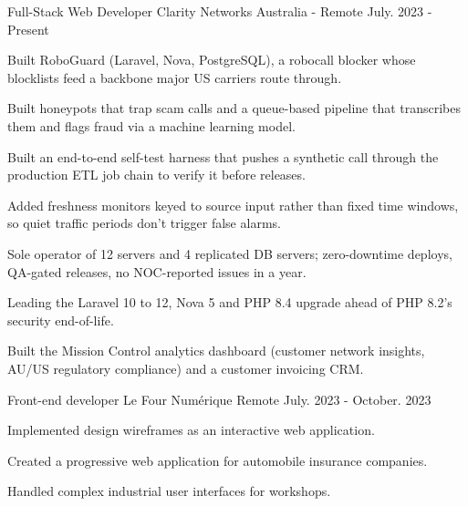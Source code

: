 

\begin{cventries}
  \cventry
    {Full-Stack Web Developer} %
    {Clarity Networks} %
    {Australia - Remote} %
    {July. 2023 - Present} %
    {
      \begin{cvitems} %
        \item {Built RoboGuard (Laravel, Nova, PostgreSQL), a robocall blocker whose blocklists feed a backbone major US carriers route through.}
        \item {Built honeypots that trap scam calls and a queue-based pipeline that transcribes them and flags fraud via a machine learning model.}
        \item {Built an end-to-end self-test harness that pushes a synthetic call through the production ETL job chain to verify it before releases.}
        \item {Added freshness monitors keyed to source input rather than fixed time windows, so quiet traffic periods don't trigger false alarms.}
        \item {Sole operator of 12 servers and 4 replicated DB servers; zero-downtime deploys, QA-gated releases, no NOC-reported issues in a year.}
        \item {Leading the Laravel 10 to 12, Nova 5 and PHP 8.4 upgrade ahead of PHP 8.2's security end-of-life.}
        \item {Built the Mission Control analytics dashboard (customer network insights, AU/US regulatory compliance) and a customer invoicing CRM.}
      \end{cvitems}
    }

  \cventry
    {Front-end developer} %
    {Le Four Numérique} %
    {Remote} %
    {July. 2023 - October. 2023} %
    {
      \begin{cvitems} %
        \item {Implemented design wireframes as an interactive web application.}
        \item {Created a progressive web application for automobile insurance companies.}
        \item {Handled complex industrial user interfaces for workshops.}
      \end{cvitems}
    }


\end{cventries}
